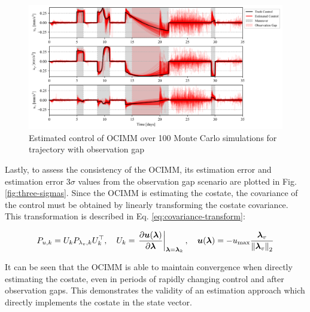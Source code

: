 \documentclass[letterpaper, preprint, paper,11pt]{AAS}	%
\begin{document}
\begin{figure}
    \centering
    \includegraphics[width=1\linewidth]{Figures/control.png}
    \caption{Estimated control of OCIMM over 100 Monte Carlo simulations for trajectory with observation gap}
    \label{fig:control}
\end{figure}

Lastly, to assess the consistency of the OCIMM, its estimation error and estimation error $3\sigma$ values from the observation gap scenario are plotted in Fig. \ref{fig:three-sigmas}. Since the OCIMM is estimating the costate, the covariance of the control must be obtained by linearly transforming the costate covariance. This transformation is described in Eq. \ref{eq:covariance-transform}:

\begin{align}
    P_{u, k} = U_kP_{\lambda_v, k}U_k^\top, \quad U_k = \left. \frac{\partial \bm{u}(\bm{\bm{\lambda}})}{\partial{\bm{\lambda}}} \right|_{\bm{\lambda}=\bm{\lambda}_k}, \quad \bm{u}(\bm{\lambda}) = -u_\text{max} \frac{\bm{\lambda}_v}{\norm{\bm{\lambda}_v}_2} \label{eq:covariance-transform}
\end{align}

\noindent It can be seen that the OCIMM is able to maintain convergence when directly estimating the costate, even in periods of rapidly changing control and after observation gaps. This demonstrates the validity of an estimation approach which directly implements the costate in the state vector. 
\end{document}

